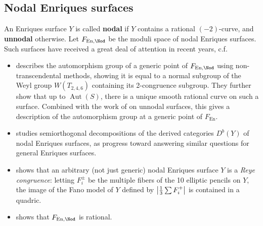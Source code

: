 \documentclass{amsart}
\begin{document}
\subsection{Nodal Enriques surfaces}\label{nodal-enriques-surfaces}

An Enriques surface \(Y\) is called \textbf{nodal} if \(Y\) contains a rational \((-2)\)-curve, and \textbf{unnodal} otherwise. Let \(F_{\operatorname{En}, \Nod}\) be the moduli space of nodal Enriques surfaces. Such surfaces have received a great deal of attention in recent years, c.f.

\begin{itemize}
\item
  \cite{cossecAutomorphismsNodalEnriques1985} describes the automorphism group of a generic point of \(F_{\operatorname{En}, \Nod}\) using non-transcendental methods, showing it is equal to a normal subgroup of the Weyl group \(W(T_{2,4,6})\) containing its 2-congruence subgroup. They further show that up to \(\mathop{\mathrm{Aut}}(S)\), there is a unique smooth rational curve on such a surface. Combined with the work of \cite{barthAutomorphismsEnriquesSurfaces1983} on unnodal surfaces, this gives a description of the automorphism group at a generic point of \(F_{\operatorname{En}}\).
\item
  \cite{ingallsNodalEnriquesSurfaces2015} studies semiorthogonal decompositions of the derived categories \(D^b(Y)\) of nodal Enriques surfaces, as progress toward answering similar questions for general Enriques surfaces.
\item
  \cite{martinNodalEnriquesSurfaces2024} shows that an arbitrary (not just generic) nodal Enriques surface \(Y\) is a \emph{Reye congruence}: letting \(F_{i}^{\pm}\) be the multiple fibers of the 10 elliptic pencils on \(Y\), the image of the Fano model of \(Y\) defined by \({\left\lvert {{1\over 3} \sum F_i^+} \right\rvert}\) is contained in a quadric.
\item
  \cite{DK13} shows that \(F_{\operatorname{En}, \Nod}\) is rational.
\end{itemize}
\end{document}
